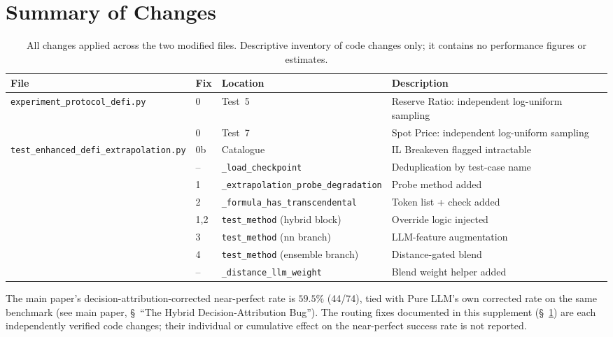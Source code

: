 \documentclass[twoside,11pt]{article}
\begin{document}
\section{Summary of Changes}
\label{sec:changes}

\begin{table}[h]
\centering
\caption{All changes applied across the two modified files.
  Descriptive inventory of code changes only; it contains no performance
  figures or estimates.}
\label{tab:changes}
\begin{tabular}{llll}
\toprule
\textbf{File} & \textbf{Fix} & \textbf{Location} & \textbf{Description} \\
\midrule
\texttt{experiment\_protocol\_defi.py}
  & 0  & Test~5  & Reserve Ratio: independent log-uniform sampling \\
  & 0  & Test~7  & Spot Price: independent log-uniform sampling \\
\midrule
\texttt{test\_enhanced\_defi\_extrapolation.py}
  & 0b & Catalogue     & IL Breakeven flagged intractable \\
  & -- & \texttt{\_load\_checkpoint} & Deduplication by test-case name \\
  & 1  & \texttt{\_extrapolation\_probe\_degradation} & Probe method added \\
  & 2  & \texttt{\_formula\_has\_transcendental} & Token list + check added \\
  & 1,2& \texttt{test\_method} (hybrid block) & Override logic injected \\
  & 3  & \texttt{test\_method} (nn branch)     & LLM-feature augmentation \\
  & 4  & \texttt{test\_method} (ensemble branch) & Distance-gated blend \\
  & -- & \texttt{\_distance\_llm\_weight} & Blend weight helper added \\
\bottomrule
\end{tabular}
\end{table}

\bigskip
\noindent The main paper's decision-attribution-corrected near-perfect rate is
$59.5\%$ (44/74), tied with Pure LLM's own corrected rate on the same benchmark (see main
paper, \S~``The Hybrid Decision-Attribution Bug''). The routing fixes documented in this
supplement (\S~\ref{sec:changes}) are each independently verified code changes; their
individual or cumulative effect on the near-perfect success rate is not reported.
\end{document}
